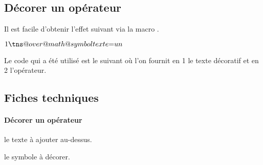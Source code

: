 \documentclass[12pt,a4paper]{article}
\begin{document}

\subsection{Décorer un opérateur}

Il est facile d'obtenir l'effet suivant via la macro .

\makeatletter
\newcommand\eqtxt{\tns@over@math@symbol{texte}{=}}
\makeatother

\begin{latexex}
$1 \eqtxt un$
\end{latexex}


Le code qui a été utilisé est le suivant où l'on fournit en 1\ier{} le texte décoratif et en 2\ieme{} l'opérateur.


\begin{latexex-alone}
\newcommand\eqtxt{\tns@over@math@symbol{texte}{=}}
\end{latexex-alone}




\subsection{Fiches techniques}

\paragraph{Décorer un opérateur}


 le texte à ajouter au-dessus.

 le symbole à décorer.
\end{document}
